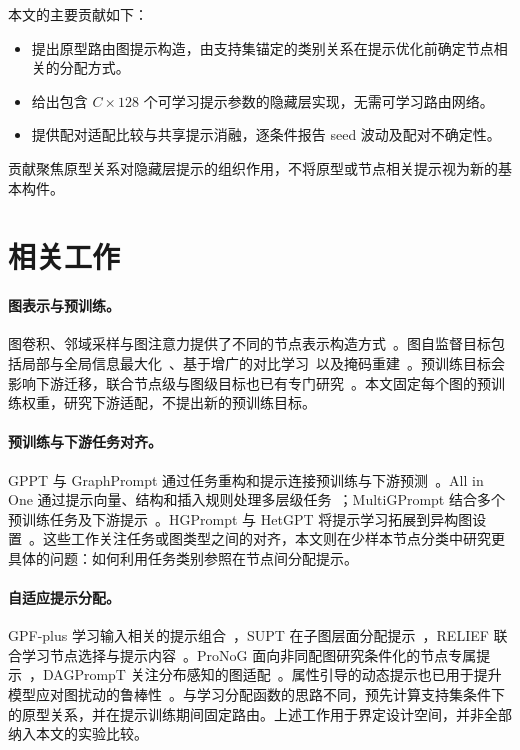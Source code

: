 本文的主要贡献如下：
\begin{itemize}
\item 提出原型路由图提示构造，由支持集锚定的类别关系在提示优化前确定节点相关的分配方式。
\item 给出包含 $C\times128$ 个可学习提示参数的隐藏层实现，无需可学习路由网络。
\item 提供配对适配比较与共享提示消融，逐条件报告 seed 波动及配对不确定性。
\end{itemize}
贡献聚焦原型关系对隐藏层提示的组织作用，不将原型或节点相关提示视为新的基本构件。

\section{相关工作}
\paragraph{图表示与预训练。}
图卷积、邻域采样与图注意力提供了不同的节点表示构造方式~\citep{gcn2017,sage2017,gat2018}。图自监督目标包括局部与全局信息最大化~\citep{dgi2019}、基于增广的对比学习~\citep{graphcl2020}以及掩码重建~\citep{graphmae2022}。预训练目标会影响下游迁移，联合节点级与图级目标也已有专门研究~\citep{pretrain2020}。本文固定每个图的预训练权重，研究下游适配，不提出新的预训练目标。

\paragraph{预训练与下游任务对齐。}
GPPT 与 GraphPrompt 通过任务重构和提示连接预训练与下游预测~\citep{gppt2022,graphprompt2023}。All in One 通过提示向量、结构和插入规则处理多层级任务~\citep{allinone2023}；MultiGPrompt 结合多个预训练任务及下游提示~\citep{multigprompt2024}。HGPrompt 与 HetGPT 将提示学习拓展到异构图设置~\citep{hgprompt2024,hetgpt2024}。这些工作关注任务或图类型之间的对齐，本文则在少样本节点分类中研究更具体的问题：如何利用任务类别参照在节点间分配提示。

\paragraph{自适应提示分配。}
GPF-plus 学习输入相关的提示组合~\citep{gpf2023}，SUPT 在子图层面分配提示~\citep{supt2026}，RELIEF 联合学习节点选择与提示内容~\citep{relief2025}。ProNoG 面向非同配图研究条件化的节点专属提示~\citep{pronog2025}，DAGPrompT 关注分布感知的图适配~\citep{dagprompt2025}。属性引导的动态提示也已用于提升模型应对图扰动的鲁棒性~\citep{adprompt2026}。与学习分配函数的思路不同，\method 预先计算支持集条件下的原型关系，并在提示训练期间固定路由。上述工作用于界定设计空间，并非全部纳入本文的实验比较。

